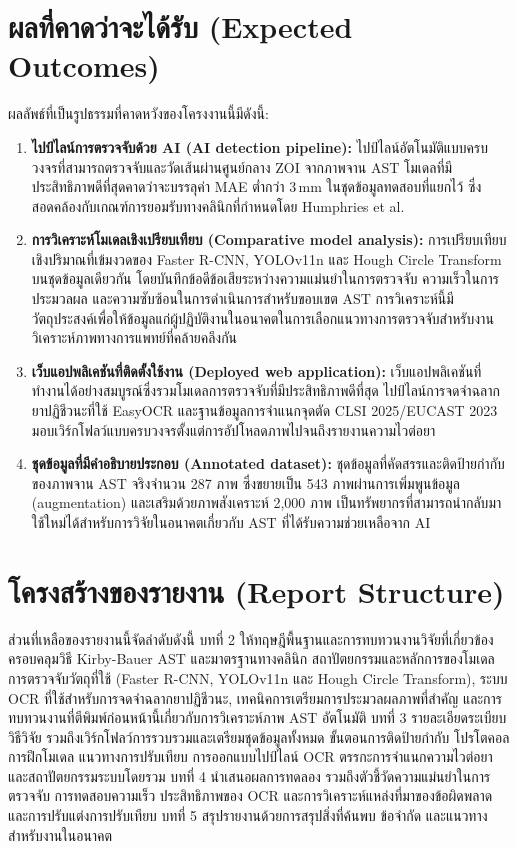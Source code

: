 \section{ผลที่คาดว่าจะได้รับ (Expected Outcomes)}

ผลลัพธ์ที่เป็นรูปธรรมที่คาดหวังของโครงงานนี้มีดังนี้:

\begin{enumerate}
  \item \textbf{ไปป์ไลน์การตรวจจับด้วย AI (AI detection pipeline):} ไปป์ไลน์อัตโนมัติแบบครบวงจรที่สามารถตรวจจับและวัดเส้นผ่านศูนย์กลาง ZOI จากภาพจาน AST โมเดลที่มีประสิทธิภาพดีที่สุดคาดว่าจะบรรลุค่า MAE ต่ำกว่า 3\,mm ในชุดข้อมูลทดสอบที่แยกไว้ ซึ่งสอดคล้องกับเกณฑ์การยอมรับทางคลินิกที่กำหนดโดย Humphries et al.\ \cite{humphries2018}

  \item \textbf{การวิเคราะห์โมเดลเชิงเปรียบเทียบ (Comparative model analysis):} การเปรียบเทียบเชิงปริมาณที่เข้มงวดของ Faster R-CNN, YOLOv11n และ Hough Circle Transform บนชุดข้อมูลเดียวกัน โดยบันทึกข้อดีข้อเสียระหว่างความแม่นยำในการตรวจจับ ความเร็วในการประมวลผล และความซับซ้อนในการดำเนินการสำหรับขอบเขต AST การวิเคราะห์นี้มีวัตถุประสงค์เพื่อให้ข้อมูลแก่ผู้ปฏิบัติงานในอนาคตในการเลือกแนวทางการตรวจจับสำหรับงานวิเคราะห์ภาพทางการแพทย์ที่คล้ายคลึงกัน

  \item \textbf{เว็บแอปพลิเคชันที่ติดตั้งใช้งาน (Deployed web application):} เว็บแอปพลิเคชันที่ทำงานได้อย่างสมบูรณ์ซึ่งรวมโมเดลการตรวจจับที่มีประสิทธิภาพดีที่สุด ไปป์ไลน์การจดจำฉลากยาปฏิชีวนะที่ใช้ EasyOCR และฐานข้อมูลการจำแนกจุดตัด CLSI 2025/EUCAST 2023 มอบเวิร์กโฟลว์แบบครบวงจรตั้งแต่การอัปโหลดภาพไปจนถึงรายงานความไวต่อยา

  \item \textbf{ชุดข้อมูลที่มีคำอธิบายประกอบ (Annotated dataset):} ชุดข้อมูลที่คัดสรรและติดป้ายกำกับของภาพจาน AST จริงจำนวน 287 ภาพ ซึ่งขยายเป็น 543 ภาพผ่านการเพิ่มพูนข้อมูล (augmentation) และเสริมด้วยภาพสังเคราะห์ 2,000 ภาพ เป็นทรัพยากรที่สามารถนำกลับมาใช้ใหม่ได้สำหรับการวิจัยในอนาคตเกี่ยวกับ AST ที่ได้รับความช่วยเหลือจาก AI
\end{enumerate}

\section{โครงสร้างของรายงาน (Report Structure)}

ส่วนที่เหลือของรายงานนี้จัดลำดับดังนี้ บทที่ 2 ให้ทฤษฎีพื้นฐานและการทบทวนงานวิจัยที่เกี่ยวข้อง ครอบคลุมวิธี Kirby-Bauer AST และมาตรฐานทางคลินิก สถาปัตยกรรมและหลักการของโมเดลการตรวจจับวัตถุที่ใช้ (Faster R-CNN, YOLOv11n และ Hough Circle Transform), ระบบ OCR ที่ใช้สำหรับการจดจำฉลากยาปฏิชีวนะ, เทคนิคการเตรียมการประมวลผลภาพที่สำคัญ และการทบทวนงานที่ตีพิมพ์ก่อนหน้านี้เกี่ยวกับการวิเคราะห์ภาพ AST อัตโนมัติ บทที่ 3 รายละเอียดระเบียบวิธีวิจัย รวมถึงเวิร์กโฟลว์การรวบรวมและเตรียมชุดข้อมูลทั้งหมด ขั้นตอนการติดป้ายกำกับ โปรโตคอลการฝึกโมเดล แนวทางการปรับเทียบ การออกแบบไปป์ไลน์ OCR ตรรกะการจำแนกความไวต่อยา และสถาปัตยกรรมระบบโดยรวม บทที่ 4 นำเสนอผลการทดลอง รวมถึงตัวชี้วัดความแม่นยำในการตรวจจับ การทดสอบความเร็ว ประสิทธิภาพของ OCR และการวิเคราะห์แหล่งที่มาของข้อผิดพลาดและการปรับแต่งการปรับเทียบ บทที่ 5 สรุปรายงานด้วยการสรุปสิ่งที่ค้นพบ ข้อจำกัด และแนวทางสำหรับงานในอนาคต
